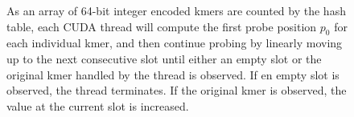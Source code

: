\begin{figure}[ht!]
\begin{center}
{
}
\caption{As an array of 64-bit integer encoded kmers are counted by the hash table, each CUDA thread will compute the first probe position $p_0$ for each individual kmer, and then continue probing by linearly moving up to the next consecutive slot until either an empty slot or the original kmer handled by the thread is observed. If en empty slot is observed, the thread terminates. If the original kmer is observed, the value at the current slot is increased.}
\label{figure:cucounter_hashtable}
\end{center}
\end{figure}
